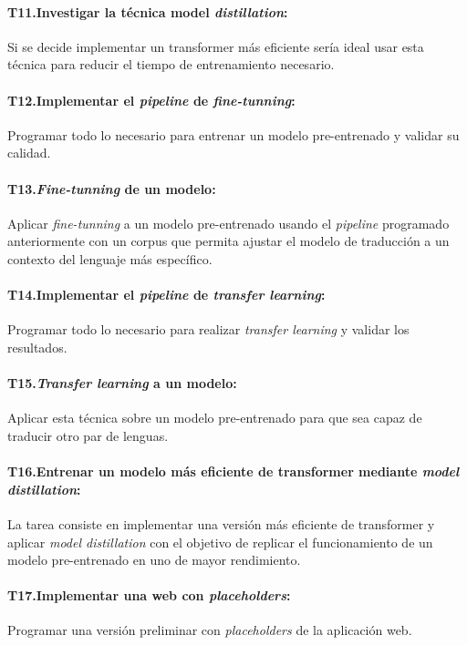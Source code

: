 \paragraph{T11.\quad Investigar la técnica model \textit{distillation}:}\label{T11}
Si se decide implementar un transformer más eficiente sería ideal usar esta técnica para
reducir el tiempo de entrenamiento necesario.
\paragraph{T12.\quad Implementar el \textit{pipeline} de \textit{fine-tunning}:}\label{T12}
Programar todo lo necesario para entrenar un modelo pre-entrenado y validar su calidad.
\paragraph{T13.\quad \textit{Fine-tunning} de un modelo:}\label{T13}
Aplicar \textit{fine-tunning} a un modelo pre-entrenado usando el \textit{pipeline} programado
anteriormente con un corpus que permita ajustar el modelo de traducción a un contexto del lenguaje
más específico.
\paragraph{T14.\quad Implementar el \textit{pipeline} de \textit{transfer learning}:}\label{T14}
Programar todo lo necesario para realizar \textit{transfer learning} y validar los resultados.
\paragraph{T15.\quad \textit{Transfer learning} a un modelo:}\label{T15}
Aplicar esta técnica sobre un modelo pre-entrenado para que sea capaz de traducir otro
par de lenguas.
\paragraph{T16.\quad Entrenar un modelo más eficiente de transformer mediante \textit{model distillation}:}\label{T16}
La tarea consiste en implementar una versión más eficiente de transformer y aplicar
\textit{model distillation} con el objetivo de replicar el funcionamiento de un modelo pre-entrenado
en uno de mayor rendimiento.
\paragraph{T17.\quad Implementar una web con \textit{placeholders}:}\label{T17}
Programar una versión preliminar con \textit{placeholders} de la aplicación web.

